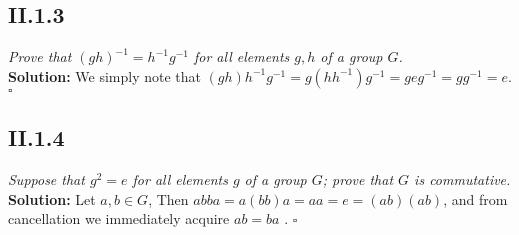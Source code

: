 \documentclass[11pt,a4paper]{article}
\begin{document}
\subsection*{II.1.3} \textit{Prove that $(gh)^{-1}=h^{-1}g^{-1}$ for all elements $g,h$ of a group $G$.}\\

\noindent \textbf{Solution: } We simply note that $(gh)h^{-1}g^{-1}= g(hh^{-1}) g^{-1}= geg^{-1} = gg^{-1} = e$. $\square$

\subsection*{II.1.4} \textit{Suppose that $g^2 = e$ for all elements $g$ of a group $G$; prove that $G$ is commutative.} \\

\noindent \textbf{Solution: } Let $a,b \in G$, Then $abba = a(bb)a = aa = e = (ab)(ab)$, and from cancellation we immediately acquire $ab = ba$ . $\square$ 
\end{document}
